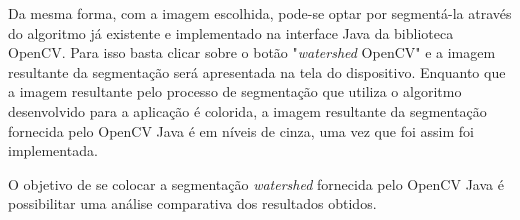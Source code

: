 Da mesma forma, com a imagem escolhida, pode-se optar por segmentá-la através do algoritmo já existente e implementado na interface Java da biblioteca OpenCV. Para isso basta clicar sobre o botão "\textit{watershed} OpenCV" e a imagem resultante da segmentação será apresentada na tela do dispositivo. Enquanto que a imagem resultante pelo processo de segmentação que utiliza o algoritmo desenvolvido para a aplicação é colorida, a imagem resultante da segmentação fornecida pelo OpenCV Java é em níveis de cinza, uma vez que foi assim foi implementada.




O objetivo de se colocar a segmentação  \textit{watershed} fornecida pelo OpenCV Java é possibilitar uma análise comparativa dos resultados obtidos.